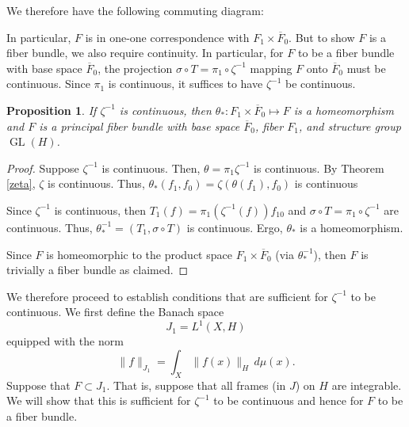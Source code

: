 \documentclass{article}
\newtheorem{prop}[defn]{Proposition}
\newcommand{\GL}{\operatorname{GL}}
\newcommand{\Fbar}{\overline{F}}
\begin{document}
We therefore have the following commuting diagram:
\begin{center}
\end{center}

In particular, $F$ is in one-one correspondence with $F_1\times\Fbar_0$. But to show $F$ is a fiber bundle, we also require continuity. In particular, for $F$ to be a fiber bundle with base space $\Fbar_0$, the projection $\sigma\circ T = \pi_1\circ\zeta^{-1}$ mapping $F$ onto $\Fbar_0$ must be continuous. Since $\pi_1$ is continuous, it suffices to have $\zeta^{-1}$ be continuous.
\begin{prop} \label{IfzetaCont}
If $\zeta^{-1}$ is continuous, then $\theta_*:F_1\times\Fbar_0\mapsto F$ is a homeomorphism and $F$ is a principal fiber bundle with base space $\Fbar_0$, fiber $F_1$, and structure group $\GL(H)$.
\end{prop}
\begin{proof}
Suppose $\zeta^{-1}$ is continuous. Then, $\theta = \pi_1\zeta^{-1}$ is continuous. By Theorem \ref{zeta}, $\zeta$ is continuous. Thus, $\theta_*(f_1,f_0) = \zeta(\theta(f_1), f_0)$ is continuous

Since $\zeta^{-1}$ is continuous, then $T_1(f) = \pi_1(\zeta^{-1}(f))f_{10}$ and $\sigma\circ T = \pi_1\circ\zeta^{-1}$ are continuous. Thus, $\theta_*^{-1} = (T_1, \sigma\circ T)$ is continuous. Ergo, $\theta_*$ is a homeomorphism.

Since $F$ is homeomorphic to the product space $F_1\times\Fbar_0$ (via $\theta_*^{-1}$), then $F$ is trivially a fiber bundle as claimed.
\end{proof}

We therefore proceed to establish conditions that are sufficient for $\zeta^{-1}$ to be continuous. We first define the Banach space
\[ J_1 = L^1(X, H) \]
equipped with the norm
\[ \|f\|_{J_1} = \int_X \|f(x)\|_H\,d\mu(x). \]
Suppose that $F\subset J_1$. That is, suppose that all frames (in $J$) on $H$ are integrable. We will show that this is sufficient for $\zeta^{-1}$ to be continuous and hence for $F$ to be a fiber bundle.
\end{document}
